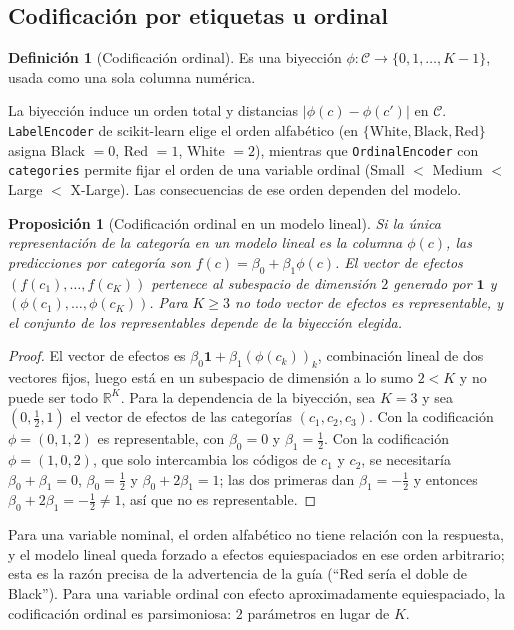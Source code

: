 \documentclass[11pt]{article}
\newtheorem{proposicion}[teorema]{Proposición}
\theoremstyle{definition}
\newtheorem{definicion}[teorema]{Definición}
\theoremstyle{remark}
\newcommand{\R}{\mathbb{R}}
\newcommand{\abs}[1]{\left\lvert #1\right\rvert}
\begin{document}
\subsection{Codificación por etiquetas u ordinal}\label{sec:label}

\begin{definicion}[Codificación ordinal]\label{def:ordinal}
\noindent Es una biyección $\phi:\mathcal{C}\to\{0,1,\dots,K-1\}$, usada como una sola columna numérica.
\end{definicion}

\noindent La biyección induce un orden total y distancias $\abs{\phi(c)-\phi(c')}$ en $\mathcal{C}$. \texttt{LabelEncoder} de scikit-learn elige el orden alfabético (en $\{\text{White},\text{Black},\text{Red}\}$ asigna Black $=0$, Red $=1$, White $=2$), mientras que \texttt{OrdinalEncoder} con \texttt{categories} permite fijar el orden de una variable ordinal (Small $<$ Medium $<$ Large $<$ X-Large). Las consecuencias de ese orden dependen del modelo.

\begin{proposicion}[Codificación ordinal en un modelo lineal]\label{prop:ordinal-lineal}
\noindent Si la única representación de la categoría en un modelo lineal es la columna $\phi(c)$, las predicciones por categoría son $f(c)=\beta_0+\beta_1\phi(c)$. El vector de efectos $(f(c_1),\dots,f(c_K))$ pertenece al subespacio de dimensión $2$ generado por $\mathbf 1$ y $(\phi(c_1),\dots,\phi(c_K))$. Para $K\ge3$ no todo vector de efectos es representable, y el conjunto de los representables depende de la biyección elegida.
\end{proposicion}
\begin{proof}
\noindent El vector de efectos es $\beta_0\mathbf1+\beta_1(\phi(c_k))_k$, combinación lineal de dos vectores fijos, luego está en un subespacio de dimensión a lo sumo $2<K$ y no puede ser todo $\R^K$. Para la dependencia de la biyección, sea $K=3$ y sea $(0,\tfrac12,1)$ el vector de efectos de las categorías $(c_1,c_2,c_3)$. Con la codificación $\phi=(0,1,2)$ es representable, con $\beta_0=0$ y $\beta_1=\frac12$. Con la codificación $\phi=(1,0,2)$, que solo intercambia los códigos de $c_1$ y $c_2$, se necesitaría $\beta_0+\beta_1=0$, $\beta_0=\frac12$ y $\beta_0+2\beta_1=1$; las dos primeras dan $\beta_1=-\frac12$ y entonces $\beta_0+2\beta_1=-\frac12\ne1$, así que no es representable.
\end{proof}

\noindent Para una variable nominal, el orden alfabético no tiene relación con la respuesta, y el modelo lineal queda forzado a efectos equiespaciados en ese orden arbitrario; esta es la razón precisa de la advertencia de la guía (``Red sería el doble de Black''). Para una variable ordinal con efecto aproximadamente equiespaciado, la codificación ordinal es parsimoniosa: $2$ parámetros en lugar de $K$.
\end{document}
